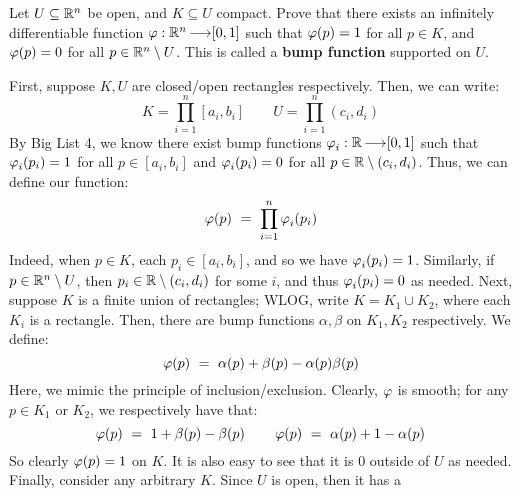 \newpage
\label{q30}
\begin{qu}[num=30]
    Let $ U \subseteq \mathbb{R}^{n} $ be open, and $ K \subseteq U $ compact.
    Prove that there exists an infinitely differentiable function $ \operatorname{\varphi}:
    \mathbb{R}^{n} \operatorname{\longrightarrow} [0, 1] $ such that $ \operatorname{\varphi}(p) = 1 $ for all $ p \in K $, and
    $ \operatorname{\varphi}(p) = 0 $ for all $ p \in \mathbb{R}^{n} \setminus U $. This is called a
    \textbf{bump function} supported on $ U $.
\end{qu}

\begin{soln}
    First, suppose $ K, U $ are closed/open rectangles respectively. Then, we can
    write:
    \begin{equation*}
        K = \prod_{i=1}^{n}[a_{i},b_{i}] \qquad
        U = \prod_{i=1}^{n}(c_{i},d_{i})
    \end{equation*}
    By Big List 4, we know there exist bump functions $ \operatorname{\varphi}_{i}:\mathbb{R}\operatorname{\longrightarrow}[0,1] $
    such that $ \operatorname{\varphi}_{i}(p_{i})=1 $ for all $ p \in [a_{i},b_{i}] $ and
    $ \operatorname{\varphi}_{i}(p_{i})=0 $ for all $ p \in \mathbb{R}\setminus(c_{i},d_{i}) $. Thus,
    we can define our function:
    \begin{equation*}
        \vphi(p) \ = \ \prod_{i=1}^{n}\vphi_{i}(p_{i})
    \end{equation*}
    Indeed, when $ p \in K $, each $ p_{i} \in [a_{i},b_{i}] $, and so we have
    $ \operatorname{\varphi}_{i}(p_{i})=1 $. Similarly, if $ p \in \mathbb{R}^{n}\setminus U $, then
    $ p_{i} \in \mathbb{R}\setminus(c_{i},d_{i}) $ for some $ i $, and thus $ \operatorname{\varphi}_{i}
    (p_{i})=0 $ as needed. \vsp
    Next, suppose $ K $ is a finite union of rectangles; WLOG, write
    $ K = K_{1} \cup K_{2} $, where each $ K_{i} $ is a rectangle. Then, there
    are bump functions $ \alpha, \beta $ on $ K_{1}, K_{2} $ respectively. We
    define:
    \begin{equation*}
        \vphi(p) \ = \ \alpha(p) + \beta(p) - \alpha(p)\beta(p)
    \end{equation*}
    Here, we mimic the principle of inclusion/exclusion. Clearly, $ \operatorname{\varphi} $ is
    smooth; for any $ p \in K_{1} $ or $ K_{2} $, we respectively have that:
    \begin{equation*}
        \operatorname{\varphi}(p) \ = \ 1 + \beta(p) - \beta(p) \qquad
        \operatorname{\varphi}(p) \ = \ \alpha(p) + 1 - \alpha(p)
    \end{equation*}
    So clearly $ \operatorname{\varphi}(p) = 1 $ on $ K $. It is also easy to see that it is 0
    outside of $ U $ as needed. \vsp
    Finally, consider any arbitrary $ K $. Since $ U $ is open, then it has a

\end{soln}
